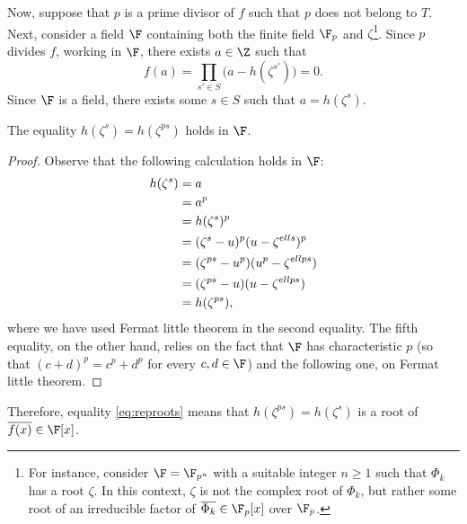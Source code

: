 Now, suppose that $p$ is a prime divisor of $f$ such that $p$ does not belong to $T$. Next, consider a field $\F$ containing both the finite field $\F_p$ and $\zeta$\footnote{For instance, consider $\F=\F_{p^n}$ with a suitable integer $n\geqslant 1$ such that $\Phi_{{k}}$ has a root $\zeta$. In this context, $\zeta$ is not the complex root of $\Phi_{{k}}$, but rather some root of an irreducible factor of $\overline{\Phi_{{k}}}\in\F_p[x]$ over $\F_p$.}. Since $p$ divides $f$, working in $\F$, there exists $a\in\Z$ such that 
\begin{equation*}
f(a)=\prod_{s'\in S}\big(a-h(\zeta^{s'})\big)=0.
\end{equation*}
Since $\F$ is a field, there exists some $s\in S$ such that $a=h(\zeta^{s})$.
\begin{lemma}
The equality $h(\zeta^s)=h(\zeta^{ps})$ holds in $\F$.
\end{lemma}
\begin{proof}
 Observe that the following calculation holds in $\F$:
\begin{align}\label{eq:reproots}
h(\zeta^{s})&=a\notag \\ 
&=a^p\notag \\ 
&=h(\zeta^{s})^p\notag \\ 
&=(\zeta^{s}-{u})^p({u}-\zeta^{{ell}s})^p\notag \\ 
&=(\zeta^{ps}-{u}^p)({u}^p-\zeta^{{ell}ps})\notag \\ 
&=(\zeta^{ps}-{u})({u}-\zeta^{{ell}ps})\notag \\ 
&=h(\zeta^{ps}),
\end{align}
where we have used Fermat little theorem in the second equality. The fifth equality, on the other hand, relies on the fact that $\F$ has characteristic $p$ (so that $(c+d)^p=c^p+d^p$ for every $c,d \in \F$) and the following one, on Fermat little theorem.
\end{proof}

Therefore, equality \eqref{eq:reproots} means that $h(\zeta^{ps})=h(\zeta^{s})$ is a root of $\overline{f(x)}\in\F[x]$. 

